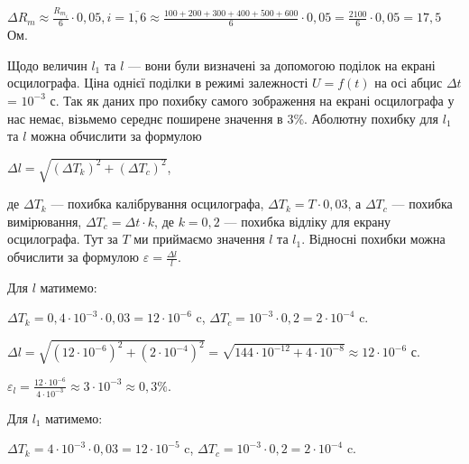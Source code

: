 \documentclass[12pt,a4paper]{article}
\begin{document}
    \vspace{1em} %
    \setlength{\parindent}{0pt}

    $\displaystyle \Delta R_m \approx \frac{R_{m_i}}{6} \cdot 0,05, i = \overline{1, 6} \approx \frac{100 + 200 + 300 + 400 + 500 + 600}{6} \cdot 0,05 = \frac{2100}{6} \cdot 0,05 = 17,5$ Ом.

    \setlength{\parindent}{1.5em}

    Щодо величин $l_1$ та $l$ --- вони були визначені за допомогою поділок на екрані осцилографа. Ціна однієї поділки в режимі залежності $U = f(t)$ на осі абцис $\Delta t$ = $10^{-3}$ с. Так як даних про похибку
    самого зображення на екрані осцилографа у нас немає, візьмемо середнє поширене значення в 3\%. Аболютну похибку для $l_1$ та $l$ можна обчислити за формулою

    \begin{center}
        $\displaystyle \Delta l = \sqrt{(\Delta T_k)^2 + (\Delta T_c)^2}$,
    \end{center}

    де $\Delta T_k$ --- похибка калібрування осцилографа, $\Delta T_k = T \cdot 0,03$, а $\Delta T_c$ --- похибка вимірювання, $\Delta T_c = \Delta t \cdot k$, де $k = 0,2$ --- похибка відліку для екрану осцилографа.
    Тут за $T$ ми приймаємо значення $l$ та $l_1$. Відносні похибки можна обчислити за формулою $\displaystyle \varepsilon = \frac{\Delta l}{l}$.

    Для $l$ матимемо:

    \vspace{1em} %

    $\displaystyle \Delta T_k = 0,4 \cdot 10^{-3} \cdot 0,03 = 12 \cdot 10^{-6}$ c, $\displaystyle \Delta T_c = 10^{-3} \cdot 0,2 = 2 \cdot 10^{-4}$ c.

    $\displaystyle \Delta l = \sqrt{\left( 12 \cdot 10^{-6}\right)^2 + \left(2 \cdot 10^{-4}\right)^2} = \sqrt{144 \cdot 10^{-12} + 4 \cdot 10^{-8}} \approx 12 \cdot 10^{-6}$ с.

    $\displaystyle \varepsilon_l = \frac{12 \cdot 10^{-6}}{4 \cdot 10^{-3}} \approx 3 \cdot 10^{-3} \approx 0,3\%$.

    \vspace{1em} %

    Для $l_1$ матимемо:

    \vspace{1em} %

    $\displaystyle \Delta T_k = 4 \cdot 10^{-3} \cdot 0,03 = 12 \cdot 10^{-5}$ c, $\displaystyle \Delta T_c = 10^{-3} \cdot 0,2 = 2 \cdot 10^{-4}$ c.
\end{document}
